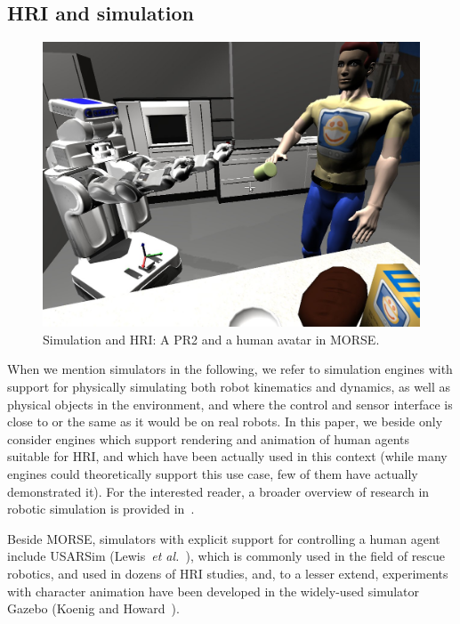 \documentclass[letterpaper, 10pt, conference]{ieeeconf}
\newcommand{\etal}{{\textit{et al.~}}}
\begin{document}
\subsection*{HRI and simulation}

\begin{figure}[ht!]
      \centering 
      \includegraphics[width=0.9\linewidth]{morse_pr2.jpg}
      \caption{Simulation and HRI: A PR2 and a human avatar in MORSE.}
      \label{fig|morse-hri}
\end{figure}

When we mention simulators in the following, we refer to simulation engines with
support for physically simulating both robot kinematics and dynamics, as well as
physical objects in the environment, and where the control and sensor interface
is close to or the same as it would be on real robots. In this paper, we beside
only consider engines which support rendering and animation of human agents
suitable for HRI, and which have been actually used in this context (while many
engines could theoretically support this use case, few of them have actually
demonstrated it). For the interested reader, a broader overview of research in
robotic simulation is provided in~\cite{Ando2010}.

Beside MORSE, simulators with explicit support for controlling a human agent
include USARSim (Lewis~\etal\cite{lewis2007usarsim}), which is commonly used in
the field of rescue robotics, and used in dozens of HRI studies, and, to a
lesser extend, experiments with character animation have been developed in the
widely-used simulator Gazebo (Koenig and Howard~\cite{Koenig2004}).


%
\end{document}
